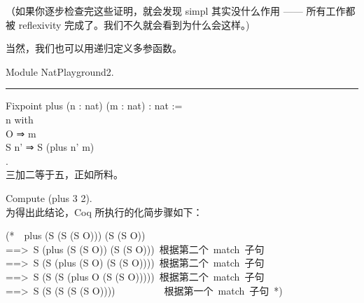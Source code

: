 \documentclass[utf8]{ctexart}
\begin{document}
（如果你逐步检查完这些证明，就会发现 {{simpl}} 其实没什么作用 ------
所有工作都被 {{reflexivity}} 完成了。我们不久就会看到为什么会这样。)

当然，我们也可以用递归定义多参函数。

{Module} {NatPlayground2}.\\

\begin{center}\rule{0.5\linewidth}{\linethickness}\end{center}

{Fixpoint} {plus} ({n} : {nat}) ({m} : {nat}) : {nat} :=\\
\hspace*{0.333em}\hspace*{0.333em}{match} {n} {with}\\
\hspace*{0.333em}\hspace*{0.333em}\hspace*{0.333em}\hspace*{0.333em}\textbar{}
{O} ⇒ {m}\\
\hspace*{0.333em}\hspace*{0.333em}\hspace*{0.333em}\hspace*{0.333em}\textbar{}
{S} {n'} ⇒ {S} ({plus} {n'} {m})\\
\hspace*{0.333em}\hspace*{0.333em}{end}.\\

三加二等于五，正如所料。

{Compute} ({plus} 3 2).\\

为得出此结论，Coq 所执行的化简步骤如下：

{(*~~{{plus}} {({S}} {({S}} {({S}} {{O})))} {({S}} {({S}} {{O}))}\\
==\textgreater~{{S}} {({plus}} {({S}} {({S}} {{O}))} {({S}} {({S}}
{{O})))}~根据第二个~{{match}}~子句\\
==\textgreater~{{S}} {({S}} {({plus}} {({S}} {{O})} {({S}} {({S}}
{{O}))))}~根据第二个~{{match}}~子句\\
==\textgreater~{{S}} {({S}} {({S}} {({plus}} {{O}} {({S}} {({S}}
{{O})))))}~根据第二个~{{match}}~子句\\
==\textgreater~{{S}} {({S}} {({S}} {({S}} {({S}}
{{O}))))}~~~~~~~~~~根据第一个~{{match}}~子句~*)}\\
\end{document}
